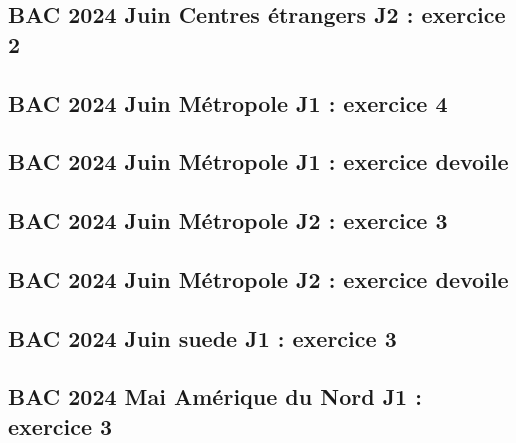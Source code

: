 \documentclass[lang=fr,edition=teacher,layout=sheet]{mxbook}
\begin{document}
\begingroup\endgroup
\par\bigskip
{}\subsection*{BAC 2024 Juin Centres étrangers J2 : exercice 2}
\begingroup\endgroup
\par\bigskip
{}\subsection*{BAC 2024 Juin Métropole J1 : exercice 4}
\begingroup\endgroup
\par\bigskip
{}\subsection*{BAC 2024 Juin Métropole J1 : exercice devoile}
\begingroup\endgroup
\par\bigskip
{}\subsection*{BAC 2024 Juin Métropole J2 : exercice 3}
\begingroup\endgroup
\par\bigskip
{}\subsection*{BAC 2024 Juin Métropole J2 : exercice devoile}
\begingroup\endgroup
\par\bigskip
{}\subsection*{BAC 2024 Juin suede J1 : exercice 3}
\begingroup\endgroup
\par\bigskip
{}\subsection*{BAC 2024 Mai Amérique du Nord J1 : exercice 3}
\end{document}
